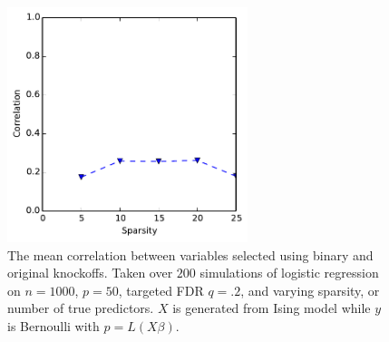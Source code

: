 \documentclass[11pt]{article}
\theoremstyle{definition}
\begin{document}
    \begin{figure}[h]
        \begin{center}
        \includegraphics[width=7cm]{images/logit_corr_50}
    \end{center}
    \caption{The mean correlation between variables selected using binary and original knockoffs. Taken over $200$ simulations of logistic regression on $n=1000$, $p=50$, targeted FDR $q=.2$, and varying sparsity, or number of true predictors. $X$ is generated from Ising model while $y$ is Bernoulli with $p=L(X\beta)$.}  
    \end{figure}

    \FloatBarrier
\end{document}
